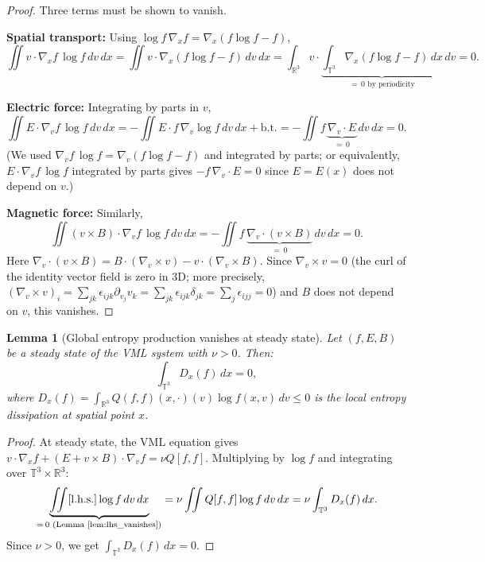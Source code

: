 \documentclass[11pt]{article}
\newcommand{\R}{\mathbb{R}}
\newcommand{\T}{\mathbb{T}}
\newtheorem{lemma}[theorem]{Lemma}
\begin{document}
\begin{proof}
Three terms must be shown to vanish.

\textbf{Spatial transport:} Using $\log f \, \nabla_x f = \nabla_x(f \log f - f)$,
\[
\iint v \cdot \nabla_x f \, \log f \, dv \, dx = \iint v \cdot \nabla_x(f \log f - f) \, dv \, dx = \int_{\R^3} v \cdot \underbrace{\int_{\T^3} \nabla_x(f \log f - f) \, dx}_{= \, 0 \text{ by periodicity}} \, dv = 0.
\]

\textbf{Electric force:} Integrating by parts in $v$,
\[
\iint E \cdot \nabla_v f \, \log f \, dv \, dx = -\iint E \cdot f \, \nabla_v \log f \, dv \, dx + \text{b.t.} = -\iint f \, \underbrace{\nabla_v \cdot E}_{= \, 0} \, dv \, dx = 0.
\]
(We used $\nabla_v f \, \log f = \nabla_v(f \log f - f)$ and integrated by parts; or equivalently, $E \cdot \nabla_v f \, \log f$ integrated by parts gives $-f \, \nabla_v \cdot E = 0$ since $E = E(x)$ does not depend on $v$.)

\textbf{Magnetic force:} Similarly,
\[
\iint (v \times B) \cdot \nabla_v f \, \log f \, dv \, dx = -\iint f \, \underbrace{\nabla_v \cdot (v \times B)}_{= \, 0} \, dv \, dx = 0.
\]
Here $\nabla_v \cdot (v \times B) = B \cdot (\nabla_v \times v) - v \cdot (\nabla_v \times B)$. Since $\nabla_v \times v = 0$ (the curl of the identity vector field is zero in 3D; more precisely, $(\nabla_v \times v)_i = \sum_{jk} \epsilon_{ijk} \partial_{v_j} v_k = \sum_{jk} \epsilon_{ijk} \delta_{jk} = \sum_j \epsilon_{ijj} = 0$) and $B$ does not depend on $v$, this vanishes.
\end{proof}

\begin{lemma}[Global entropy production vanishes at steady state]
\label{lem:global_entropy_zero}
Let $(f, E, B)$ be a steady state of the VML system with $\nu > 0$. Then:
\[
\int_{\T^3} D_x(f) \, dx = 0,
\]
where $D_x(f) = \int_{\R^3} Q(f,f)(x, \cdot)(v) \log f(x, v) \, dv \leq 0$ is the local entropy dissipation at spatial point $x$.
\end{lemma}

\begin{proof}
At steady state, the VML equation gives $v \cdot \nabla_x f + (E + v \times B) \cdot \nabla_v f = \nu Q[f,f]$. Multiplying by $\log f$ and integrating over $\T^3 \times \R^3$:
\[
\underbrace{\iint [\text{l.h.s.}] \log f \, dv \, dx}_{= \, 0 \text{ (Lemma~\ref{lem:lhs_vanishes})}} = \nu \iint Q[f,f] \log f \, dv \, dx = \nu \int_{\T^3} D_x(f) \, dx.
\]
Since $\nu > 0$, we get $\int_{\T^3} D_x(f) \, dx = 0$.
\end{proof}
\end{document}
